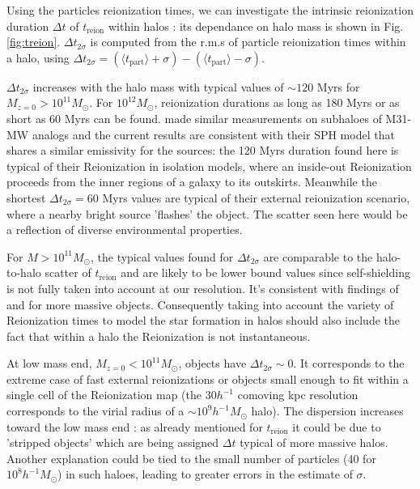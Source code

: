 \documentclass[twocolumn]{aastex61}
\begin{document}
%

Using the particles reionization times, we can investigate the intrinsic reionization duration $\Delta t$ of $t_\mathrm{reion}$ within halos : its dependance on halo mass is shown in Fig. \ref{fig:treion}. $\Delta t_{2\sigma}$ is computed from the r.m.s of particle reionization times within a halo, using $\Delta t_{2\sigma}=(\langle t_\mathrm{part}\rangle+\sigma)-(\langle t_\mathrm{part}\rangle-\sigma)$. 

$\Delta t_{2\sigma}$ increases with the halo mass with typical values of $\sim 120$ Myrs for $M_{z=0}>10^{11} M_\odot$. For $10^{12} M_\odot$, reionization durations as long as 180 Myrs or as short as 60 Myrs can be found. \citet{OCV14} made similar measurements on subhaloes of M31-MW analogs and the current results are consistent with their SPH model that shares a similar emissivity for the sources: the 120 Myrs duration found here is typical of their Reionization in isolation models, where an inside-out Reionization proceeds from the inner regions of a galaxy to its outskirts. Meanwhile the shortest $\Delta t_{2\sigma}=60$ Myrs values are typical of their external reionization scenario, where a nearby bright source 'flashes' the object. The scatter seen here would be a reflection of diverse environmental properties.

For $M>10^{11} M_\odot$, the typical values found for $\Delta t_{2\sigma}$ are comparable to the halo-to-halo scatter of $t_\mathrm{reion}$ and are likely to be lower bound values since self-shielding is not fully taken into account at our resolution. It's consistent with findings of \citet{ALV9} and \citet{LI14} for more massive objects. Consequently taking into account the variety of Reionization times to model the star formation in halos should also include the fact that within a halo the Reionization is not instantaneous. 

At low mass end, $M_{z=0}<10^{11} M_\odot$, objects have $\Delta t_{2\sigma}\sim 0$. It corresponds to the extreme case of fast external reionizations or objects small enough to fit within a single cell of the Reionization map (the $30 h^{-1}$ comoving kpc resolution corresponds to the virial radius of a $\sim 10^9 h^{-1} M_\odot$ halo). The dispersion increases toward the low mass end : as already mentioned for $t_\mathrm{reion}$ it could be due to 'stripped objects' which are being assigned $\Delta t$ typical of more massive halos. Another explanation could be tied to the small number of particles (40 for $10^8 h^{-1} M_\odot$) in such haloes, leading to greater errors in the estimate of $\sigma$.
\end{document}

